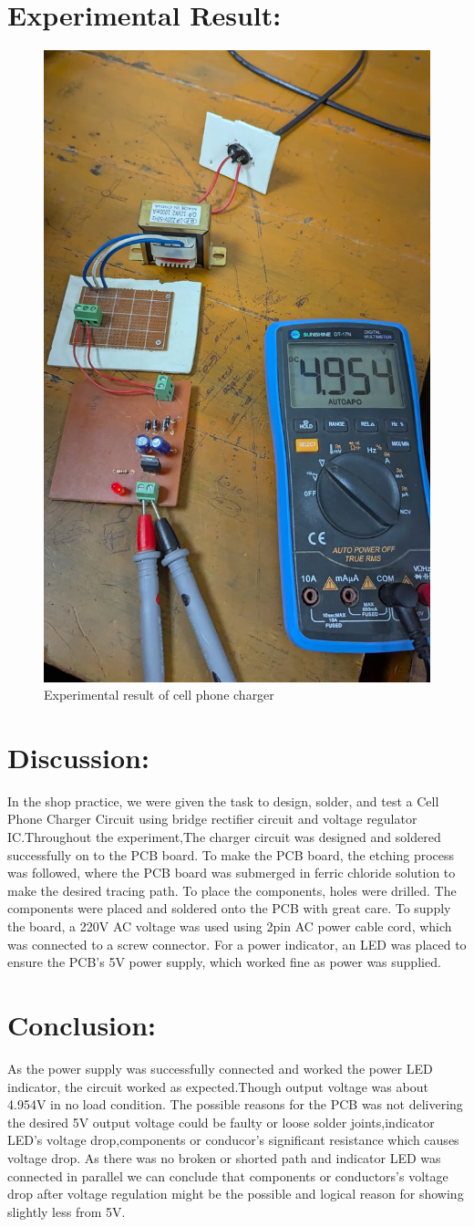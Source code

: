 \documentclass[a4paper,12pt]{article}
\begin{document}
	\section*{Experimental Result:}
		\begin{figure}[H]
		\centering
		\includegraphics[width=0.44 \linewidth]{"Images/5"}
		
		\caption{Experimental result of cell phone charger}
	\end{figure}
	\section*{Discussion:}
	In the shop practice, we were given the task to design, solder, and test  a Cell Phone Charger Circuit using bridge rectifier circuit and voltage regulator IC.Throughout the experiment,The charger circuit was designed and soldered successfully on to the PCB board. To make the PCB board, the etching process was followed, where the PCB board was submerged in ferric chloride solution to make the desired tracing path. To place the components, holes were drilled. The components were placed and soldered onto the PCB with great care. To supply the board, a 220V AC voltage was used using 2pin AC power cable cord, which was connected to a screw connector. For a power indicator, an LED was placed to ensure the PCB's 5V power supply, which worked fine as power was supplied.
	\section*{Conclusion:}
	
	As the power supply was successfully connected and worked the power LED indicator, the circuit worked as expected.Though output voltage was about 4.954V in no load condition. The possible reasons for the PCB was not delivering the desired 5V output voltage could be faulty or loose solder joints,indicator LED's voltage drop,components or conducor's significant resistance which causes voltage drop. As there was no broken or shorted path and indicator LED was connected in parallel we can conclude that components or conductors's voltage drop after voltage regulation might be the possible and logical reason for showing slightly less from 5V.
	
	
\end{document}
